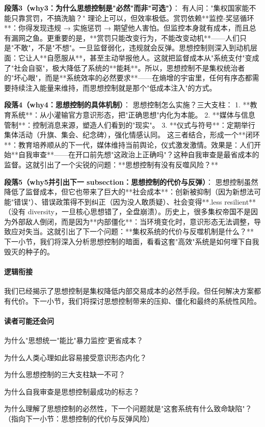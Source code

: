 \documentclass[openany, a4paper, 12pt]{book}
\begin{document}
	\textbf{段落3（why3：为什么思想控制是"必然"而非"可选"）}：  
	有人问："集权国家能不能只靠赏罚，不搞洗脑？" 理论上可以，但效率极低。赏罚依赖**监控-奖惩循环**：你得发现违规 → 实施惩罚 → 期望他人害怕。但监控本身就有成本，而且总有漏网之鱼。更重要的是，**赏罚只能改变行为，不能改变动机**——人们只是"不敢"，不是"不想"。一旦监督弱化，违规就会反弹。思想控制则深入到动机层面：它让人**自愿服从**，甚至主动举报他人。这就把监督成本从"系统支付"变成了"社会自驱"，极大降低了系统的**能耗**。所以，思想控制不是集权统治者的"坏心眼"，而是**系统效率的必然要求**——在熵增的宇宙里，任何有序态都需要持续注入能量来维持，而思想控制就是那个"低成本注入"的方式。
	
	\textbf{段落4（why4：思想控制的具体机制）}：  
	思想控制怎么实施？三大支柱：  
    1. **教育系统**：从小灌输官方意识形态，把"正确思想"内化为本能。
    2. **媒体与信息管制**：控制消息来源，塑造人们看到的"现实"。  
    3. **仪式与符号**：定期举行集体活动（升旗、集会、纪念碑），强化情感认同。  
    这三者结合，形成一个**闭环**：教育培养顺从的下一代，媒体维持当前舆论，仪式激发激情。效果是：人们开始**自我审查**——在开口前先想"这政治上正确吗"？这种自我审查是最省成本的监督。这就引出了一个尖锐的问题：**思想控制有没有反噬风险？**
	
	\textbf{段落5（why5并引出下一 subsection：思想控制的代价与反弹）}：  
	思想控制虽然降低了监督成本，但它也带来了巨大的**社会成本**：创新被抑制（因为新想法可能"错误"）、错误政策得不到纠正（因为没人敢质疑）、社会变得**.less resilient**（没有 diversity，一旦核心思想错了，全盘崩溃）。历史上，很多集权帝国不是因为外部敌人倒闭，而是因为**内部僵化**：当环境变化时，意识形态无法调整，导致应对失当。这就引出了下一个问题：**集权系统的代价与反噬机制是什么？** 下一小节，我们将深入分析思想控制的暗面，看看这套"高效"系统是如何埋下自我毁灭的种子的。
	
	\paragraph*{逻辑衔接}
	我们已经揭示了思想控制是集权降低内部交易成本的必然手段。但任何解决方案都有代价。下一小节，我们将探讨思想控制带来的压抑、僵化和最终的系统性风险。
	
	\paragraph*{读者可能还会问}
	\item 为什么"思想统一"能比"暴力监控"更省成本？
	\item 为什么人类心理如此容易接受意识形态内化？
	\item 为什么思想控制的三大支柱缺一不可？
	\item 为什么自我审查是思想控制最成功的标志？
	\item 为什么理解了思想控制的必然性，下一个问题就是"这套系统有什么致命缺陷"？（指向下一小节：思想控制的代价与反弹风险）
	
\end{document}
